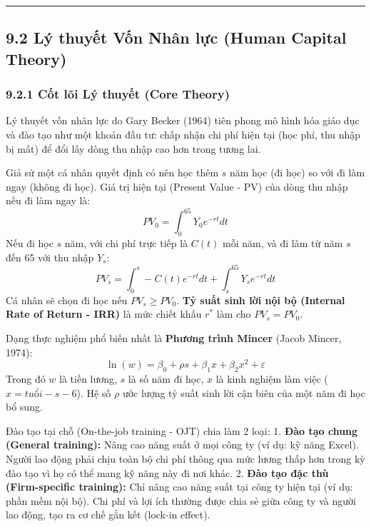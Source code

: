 \documentclass[
]{article}
\begin{document}
\begin{center}\rule{0.5\linewidth}{0.5pt}\end{center}

\subsection{9.2 Lý thuyết Vốn Nhân lực (Human Capital
Theory)}\label{luxfd-thuyux1ebft-vux1ed1n-nhuxe2n-lux1ef1c-human-capital-theory}

\subsubsection{9.2.1 Cốt lõi Lý thuyết (Core
Theory)}\label{cux1ed1t-luxf5i-luxfd-thuyux1ebft-core-theory-33}

Lý thuyết vốn nhân lực do Gary Becker (1964) tiên phong mô hình hóa giáo
dục và đào tạo như một khoản đầu tư: chấp nhận chi phí hiện tại (học
phí, thu nhập bị mất) để đổi lấy dòng thu nhập cao hơn trong tương lai.

Giả sử một cá nhân quyết định có nên học thêm \(s\) năm học (đi học) so
với đi làm ngay (không đi học). Giá trị hiện tại (Present Value - PV)
của dòng thu nhập nếu đi làm ngay là:
\[ PV_0 = \int_0^{65} Y_0 e^{-rt} dt \] Nếu đi học \(s\) năm, với chi
phí trực tiếp là \(C(t)\) mỗi năm, và đi làm từ năm \(s\) đến 65 với thu
nhập \(Y_s\):
\[ PV_s = \int_0^s -C(t) e^{-rt} dt + \int_s^{65} Y_s e^{-rt} dt \] Cá
nhân sẽ chọn đi học nếu \(PV_s \geq PV_0\). \textbf{Tỷ suất sinh lời nội
bộ (Internal Rate of Return - IRR)} là mức chiết khấu \(r^*\) làm cho
\(PV_s = PV_0\).

Dạng thực nghiệm phổ biến nhất là \textbf{Phương trình Mincer} (Jacob
Mincer, 1974):
\[ \ln(w) = \beta_0 + \rho s + \beta_1 x + \beta_2 x^2 + \varepsilon \]
Trong đó \(w\) là tiền lương, \(s\) là số năm đi học, \(x\) là kinh
nghiệm làm việc (\(x = tuổi - s - 6\)). Hệ số \(\rho\) ước lượng tỷ suất
sinh lời cận biên của một năm đi học bổ sung.

Đào tạo tại chỗ (On-the-job training - OJT) chia làm 2 loại: 1.
\textbf{Đào tạo chung (General training):} Nâng cao năng suất ở mọi công
ty (ví dụ: kỹ năng Excel). Người lao động phải chịu toàn bộ chi phí
thông qua mức lương thấp hơn trong kỳ đào tạo vì họ có thể mang kỹ năng
này đi nơi khác. 2. \textbf{Đào tạo đặc thù (Firm-specific training):}
Chỉ nâng cao năng suất tại công ty hiện tại (ví dụ: phần mềm nội bộ).
Chi phí và lợi ích thường được chia sẻ giữa công ty và người lao động,
tạo ra cơ chế gắn kết (lock-in effect).
\end{document}
